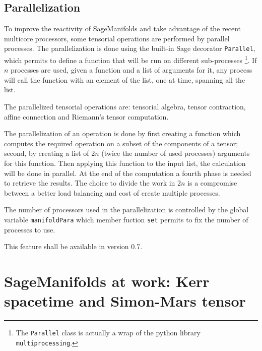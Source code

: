\documentclass[a4paper]{jpconf}
\newcommand{\soft}[1]{\textsf{#1}}
\newcommand{\code}[1]{\texttt{#1}}
\newcommand{\Sage}{\soft{Sage}}
\newcommand{\SM}{\soft{SageManifolds}}
\begin{document}
\subsection{Parallelization}



To improve the reactivity of \SM{} and take advantage of
the recent multicore processors, some tensorial operations are performed by
parallel processes. The parallelization is done using the built-in
\Sage{} decorator \code{Parallel}, which permits to define a function
that will be run on different sub-processes 
\footnote{The \code{Parallel} class is actually a wrap of the python library
\code{multiprocessing}.}. If $n$ processes are used, given a function
and a list of arguments for it, any process will call the function
with an element of the list, one at time, spanning all the list.

The parallelized tensorial operations are: tensorial algebra, tensor
contraction, affine connection and Riemann's tensor computation. 

The parallelization of an operation is done by first creating a
function which computes the required operation on a subset of the
components of a tensor; second, by creating a list of $2n$ (twice the
number of used processes) arguments for this function. Then applying this function
to the input list, the calculation will be done in parallel. 
At the end of the computation a fourth phase is needed to retrieve the
results.
The choice to divide the work in $2n$ is a compromise between a better
load balancing and cost of create multiple processes.

The number of processors used in the parallelization is controlled by
the global variable \code{manifoldPara} which member fuction \code{set}
permits to fix the number of processes to use.

This feature shall be available in version 0.7. 



\section{SageManifolds at work: Kerr spacetime and Simon-Mars tensor}
\end{document}

